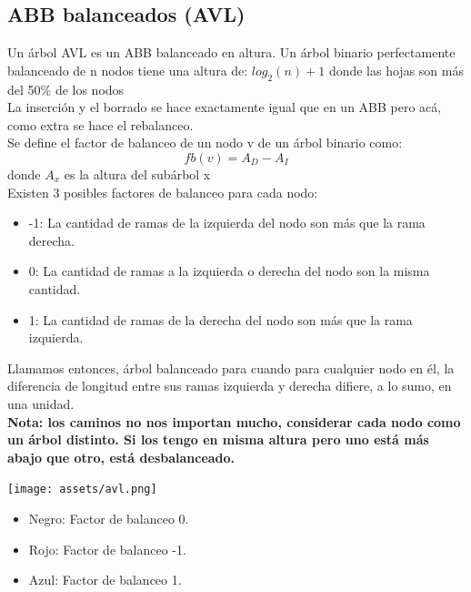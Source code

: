 \documentclass[10pt,a4paper]{article}
\begin{document}
\subsection*{ABB balanceados (AVL)}
Un árbol AVL es un ABB balanceado en altura. Un árbol binario perfectamente balanceado de n nodos tiene una altura de: $ log_{2}(n) + 1 $ donde las hojas son más del 50\% de los nodos  \\
La inserción y el borrado se hace exactamente igual que en un ABB pero acá, como extra se hace el rebalanceo. \\ 
Se define el factor de balanceo de un nodo v de un árbol binario como: \\
\[fb(v) = A_{D} - A_{I}\] donde $ A_{x}$ es la altura del subárbol x \\
Existen 3 posibles factores de balanceo para cada nodo: 
\begin{itemize}
    \item -1: La cantidad de ramas de la izquierda del nodo son más que la rama derecha.
    \item 0: La cantidad de ramas a la izquierda o derecha del nodo son la misma cantidad.
    \item 1: La cantidad de ramas de la derecha del nodo son más que la rama izquierda.
\end{itemize}
Llamamos entonces, árbol balanceado para cuando para cualquier nodo en él, la diferencia de longitud entre sus ramas izquierda y derecha difiere, a lo sumo, en una unidad. \\ 
\textbf{Nota: los caminos no nos importan mucho, considerar cada nodo como un árbol distinto. Si los tengo en misma altura pero uno está más abajo que otro, está desbalanceado. }
\begin{center}
    \begin{minipage}[b]{0.5\textwidth}
        \texttt{[image: assets/avl.png]}
        \centering
        \label{fig:avl}
    \end{minipage}
\end{center}
\begin{itemize}
    \item Negro: Factor de balanceo 0.
    \item Rojo: Factor de balanceo -1.
    \item Azul: Factor de balanceo 1.
\end{itemize}
\end{document}
